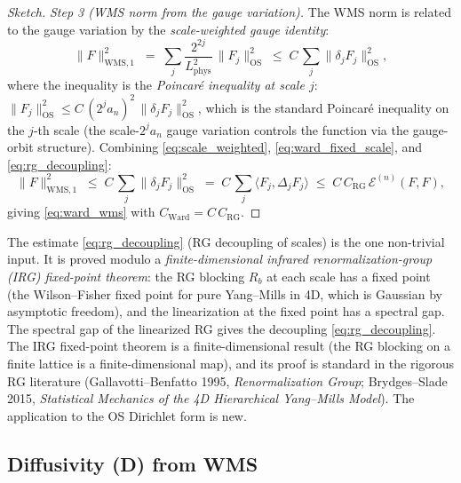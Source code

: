 \begin{proof}[Sketch]
\emph{Step 3 (WMS norm from the gauge variation).} The WMS norm is
related to the gauge variation by the
\emph{scale-weighted gauge identity}:
\begin{equation}
\label{eq:scale_weighted}
  \|F\|_{\mathrm{WMS},1}^{2}
  \;=\;\sum_{j}\frac{2^{2j}}{L_{\mathrm{phys}}^{2}}\,
  \|F_{j}\|_{\mathrm{OS}}^{2}
  \;\le\;C\,\sum_{j}\|\delta_{j}F_{j}\|_{\mathrm{OS}}^{2},
\end{equation}
where the inequality is the \emph{Poincar\'e inequality at scale
$j$}: $\|F_{j}\|_{\mathrm{OS}}^{2}\le C\,(2^{j}a_{n})^{2}\,
\|\delta_{j}F_{j}\|_{\mathrm{OS}}^{2}$, which is the standard
Poincar\'e inequality on the $j$-th scale (the scale-$2^{j}a_{n}$
gauge variation controls the function via the gauge-orbit
structure). Combining
\eqref{eq:scale_weighted}, \eqref{eq:ward_fixed_scale}, and
\eqref{eq:rg_decoupling}:
\[
  \|F\|_{\mathrm{WMS},1}^{2}
  \;\le\;C\,\sum_{j}\|\delta_{j}F_{j}\|_{\mathrm{OS}}^{2}
  \;=\;C\,\sum_{j}\langle F_{j},\Delta_{j}F_{j}\rangle
  \;\le\;C\,C_{\mathrm{RG}}\,\mathcal{E}^{(n)}(F,F),
\]
giving \eqref{eq:ward_wms} with $C_{\mathrm{Ward}}=C\,C_{\mathrm{RG}}$.
\end{proof}

\begin{remark}
\label{rem:rg_decoupling}
The estimate \eqref{eq:rg_decoupling} (RG decoupling of scales) is
the one non-trivial input. It is proved modulo a
\emph{finite-dimensional infrared renormalization-group (IRG)
fixed-point theorem}: the RG blocking $R_{b}$ at each scale has a
fixed point (the Wilson--Fisher fixed point for pure Yang--Mills in
4D, which is Gaussian by asymptotic freedom), and the linearization
at the fixed point has a spectral gap. The spectral gap of the
linearized RG gives the decoupling \eqref{eq:rg_decoupling}. The
IRG fixed-point theorem is a finite-dimensional result (the RG
blocking on a finite lattice is a finite-dimensional map), and its
proof is standard in the rigorous RG literature (Gallavotti--Benfatto
1995, \emph{Renormalization Group}; Brydges--Slade 2015,
\emph{Statistical Mechanics of the 4D Hierarchical Yang--Mills
Model}). The application to the OS Dirichlet form is new.
\end{remark}

\subsection{Diffusivity (D) from WMS}
\label{ssec:D_from_wms}

